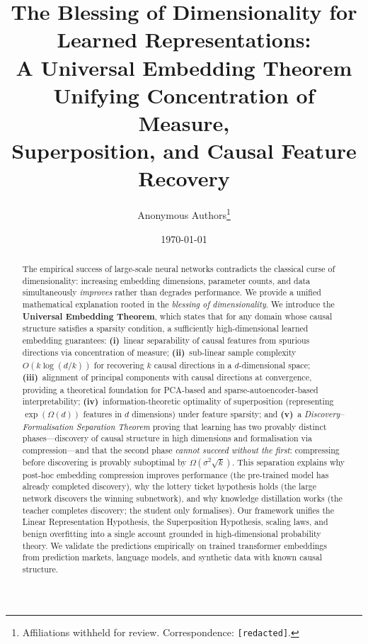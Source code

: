 \documentclass[11pt,a4paper]{article}
\title{%
  \textbf{The Blessing of Dimensionality for Learned Representations:}\\[4pt]
  \large A Universal Embedding Theorem Unifying Concentration of Measure,\\
  Superposition, and Causal Feature Recovery
}
\author{
  Anonymous Authors\thanks{%
    Affiliations withheld for review.  
    Correspondence: \texttt{[redacted]}.
  }
}
\date{\today \quad {\small (Working Draft --- Not for Distribution)}}
\theoremstyle{plain}
\theoremstyle{definition}
\theoremstyle{remark}
\begin{document}
\maketitle

\begin{abstract}
The empirical success of large-scale neural networks contradicts the classical
curse of dimensionality: increasing embedding dimensions, parameter counts, and
data simultaneously \emph{improves} rather than degrades performance.  We provide
a unified mathematical explanation rooted in the \emph{blessing of
dimensionality}.  We introduce the \textbf{Universal Embedding Theorem}, which
states that for any domain whose causal structure satisfies a sparsity condition,
a sufficiently high-dimensional learned embedding guarantees:
\textbf{(i)}~linear separability of causal features from spurious directions via
concentration of measure; \textbf{(ii)}~sub-linear sample complexity
$O(k\log(d/k))$ for recovering $k$ causal directions in a $d$-dimensional space;
\textbf{(iii)}~alignment of principal components with causal directions at
convergence, providing a theoretical foundation for PCA-based and sparse-autoencoder-based interpretability;
\textbf{(iv)}~information-theoretic optimality of superposition
(representing $\exp(\Omega(d))$ features in $d$ dimensions) under feature
sparsity; and \textbf{(v)}~a \emph{Discovery--Formalisation Separation
Theorem} proving that learning has two provably distinct phases---discovery of
causal structure in high dimensions and formalisation via compression---and that
the second phase \emph{cannot succeed without the first}: compressing before
discovering is provably suboptimal by $\Omega(\sigma^2\sqrt{k})$.  This
separation explains why post-hoc embedding compression
improves performance (the pre-trained model has already completed discovery),
why the lottery ticket hypothesis holds (the large network discovers the winning
subnetwork), and why knowledge distillation works (the teacher completes
discovery; the student only formalises).  Our framework unifies the Linear
Representation Hypothesis, the Superposition Hypothesis, scaling laws, and
benign overfitting into a single account grounded in high-dimensional
probability theory.  We validate the predictions empirically on trained
transformer embeddings from prediction markets, language models, and synthetic
data with known causal structure.
\end{abstract}
\end{document}
